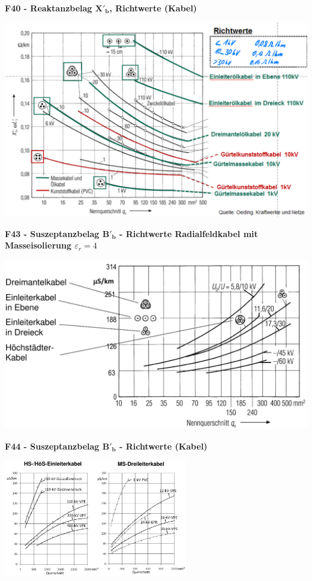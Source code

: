 \raggedright
\textbf{F40 - Reaktanzbelag $\mathbf{X'_b}$, Richtwerte (Kabel)}

\centering
\includegraphics[width=0.7\columnwidth]{figures/f39_reaktanzbelag_kabel.png}

\raggedright
\textbf{F43 - Suszeptanzbelag $\mathbf{B'_b}$ - Richtwerte Radialfeldkabel mit Masseisolierung $\varepsilon_r = 4$}

\centering
\includegraphics[width=0.7\columnwidth]{figures/f43_kabel_radialfeldkabel_masseiso.png}

\raggedright
\textbf{F44 - Suszeptanzbelag $\mathbf{B'_b}$ - Richtwerte (Kabel)}

\centering
\includegraphics[width=0.6\textwidth]{figures/f44_suszeptanzbelag_weitere_kabeltypen.png}

\raggedright
